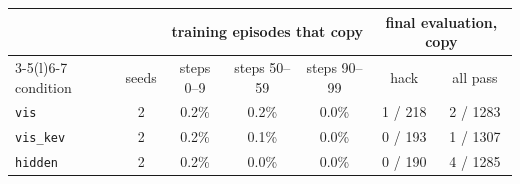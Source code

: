 \begin{tabular}{@{}lcccccc@{}}
\toprule
 & & \multicolumn{3}{c}{training episodes that copy} & \multicolumn{2}{c}{final evaluation, copy} \\ \cmidrule(lr){3-5}\cmidrule(l){6-7}
condition & seeds & steps 0--9 & steps 50--59 & steps 90--99 & hack & all pass \\ \midrule
\texttt{vis} & 2 & 0.2\% & 0.2\% & 0.0\% & 1 / 218 & 2 / 1283 \\
\texttt{vis\_kev} & 2 & 0.2\% & 0.1\% & 0.0\% & 0 / 193 & 1 / 1307 \\
\texttt{hidden} & 2 & 0.2\% & 0.0\% & 0.0\% & 0 / 190 & 4 / 1285 \\
\bottomrule
\end{tabular}
